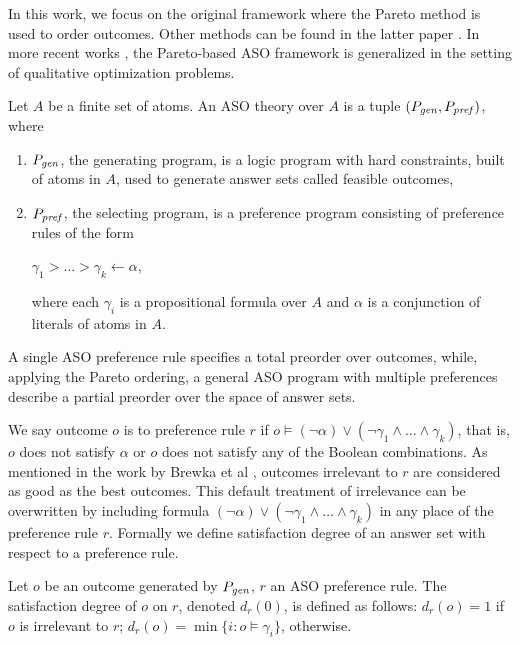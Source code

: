 In this work, we focus on the original framework \cite{Brewka03answerset} where 
the Pareto method is used to order outcomes.
Other methods can be found in the latter paper \cite{Brewka04}.
In more recent works \cite{Faber:QOP,Faber:APF}, 
the Pareto-based ASO framework is generalized in the setting of
qualitative optimization problems.


\begin{definition}
	Let $A$ be a finite set of atoms.
	An ASO theory over $A$ is a tuple $(P_{\mathit{gen}},P_{\mathit{pref}})$, where
	\begin{enumerate} \itemsep -4pt
		\item $P_{\mathit{gen}}$, the generating program, is a logic program
					with hard constraints, built of atoms in $A$,
					used to generate answer sets called feasible outcomes,
		\item $P_{\mathit{pref}}$, the selecting program, is a preference
					program consisting of preference rules of the form
			\begin{center}
				$\gamma_1 > \ldots > \gamma_k \leftarrow \alpha$,
			\end{center}
					where each $\gamma_i$ is a propositional formula
					over $A$ and $\alpha$ is a conjunction of
					literals of atoms in $A$.
	\end{enumerate}
\end{definition}


A single ASO preference rule specifies a total preorder over outcomes, while,
applying the Pareto ordering, a general ASO program with multiple preferences
describe a partial preorder over the space of answer sets.

We say outcome $o$ is  to preference rule $r$ if
$o \models (\neg \alpha) \vee (\neg \gamma_1 \wedge \ldots \wedge \gamma_k)$,
that is, $o$ does not satisfy $\alpha$ or $o$ does not satisfy any of
the Boolean combinations. As mentioned in the work by Brewka et al \cite{Brewka03answerset},
outcomes irrelevant to $r$ are considered as good as the
best outcomes.
This default treatment of irrelevance can be overwritten by
including formula $(\neg \alpha) \vee (\neg \gamma_1 \wedge \ldots \wedge \gamma_k)$
in any place of the preference rule $r$.
Formally we define satisfaction degree of an answer set with respect to a
preference rule.
\begin{definition}
	Let $o$ be an outcome generated by $P_{\mathit{gen}}$,
	$r$ an ASO preference rule.
	The satisfaction degree of $o$ on $r$, denoted $d_r(0)$,
	is defined as follows: $d_r(o)=1$ if $o$ is irrelevant to $r$;
	$d_r(o)=\min\{i:o \models \gamma_i\}$, otherwise.
\end{definition}

